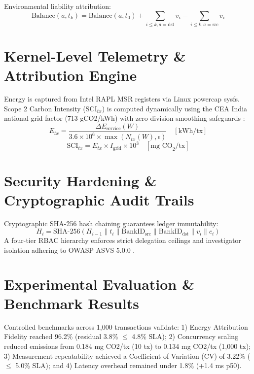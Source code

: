 \documentclass[conference]{IEEEtran}
\begin{document}
Environmental liability attribution:
\begin{equation}
\text{Balance}(a, t_k) = \text{Balance}(a, t_0) + \sum_{i \le k, a=\text{dst}} v_i - \sum_{i \le k, a=\text{src}} v_i
\end{equation}

\section{Kernel-Level Telemetry \& Attribution Engine}
Energy is captured from Intel RAPL MSR registers via Linux powercap sysfs. Scope 2 Carbon Intensity ($\text{SCI}_{tx}$) is computed dynamically using the CEA India national grid factor (713 gCO2/kWh) \cite{cea2023} with zero-division smoothing safeguards \cite{iso21031, ghg2015}:
\begin{equation}
E_{tx} = \frac{\Delta E_{\text{service}}(W)}{3.6 \times 10^6 \times \max(N_{tx}(W), \epsilon)} \quad [\text{kWh/tx}]
\end{equation}
\begin{equation}
\text{SCI}_{tx} = E_{tx} \times I_{\text{grid}} \times 10^3 \quad [\text{mg CO}_2 / \text{tx}]
\end{equation}

\section{Security Hardening \& Cryptographic Audit Trails}
Cryptographic SHA-256 hash chaining guarantees ledger immutability:
\begin{equation}
H_i = \text{SHA-256}( H_{i-1} \parallel t_i \parallel \text{BankID}_{\text{src}} \parallel \text{BankID}_{\text{dst}} \parallel v_i \parallel c_i )
\end{equation}
A four-tier RBAC hierarchy enforces strict delegation ceilings and investigator isolation adhering to OWASP ASVS 5.0.0 \cite{owasp2024}.

\section{Experimental Evaluation \& Benchmark Results}
Controlled benchmarks across 1,000 transactions validate: 1) Energy Attribution Fidelity reached 96.2\% (residual 3.8\% $\le$ 4.8\% SLA); 2) Concurrency scaling reduced emissions from 0.184 mg CO2/tx (10 tx) to 0.134 mg CO2/tx (1,000 tx); 3) Measurement repeatability achieved a Coefficient of Variation (CV) of 3.22\% ($\le$ 5.0\% SLA); and 4) Latency overhead remained under 1.8\% (+1.4 ms p50).
\end{document}
